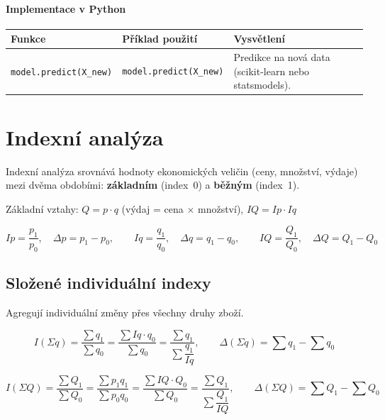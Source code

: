 \documentclass[a4paper, 11pt]{article}
\newenvironment{funkcedict}
{%
  \begingroup
  \renewcommand{\arraystretch}{1.4}%
  \lstset{basicstyle=\ttfamily\small, columns=fullflexible}%
  \setlength{\tabcolsep}{4pt}%
  \begin{tabular}{p{0.19\textwidth} p{0.38\textwidth} p{0.30\textwidth}}
  \textbf{Funkce} & \textbf{Příklad použití} & \textbf{Vysvětlení} \\
  \midrule
}
{%
  \end{tabular}%
  \endgroup
}
\begin{document}
\paragraph{Implementace v Python}\mbox{}\par

\begin{funkcedict}

	\texttt{model.predict(\allowbreak X\_new)} &
	\begin{lstlisting}
model.predict(X_new)
	\end{lstlisting}
	& Predikce na nová data (scikit-learn nebo statsmodels). \\

\end{funkcedict}


\clearpage
\section{Indexní analýza}

Indexní analýza srovnává hodnoty ekonomických veličin (ceny, množství, výdaje)
mezi dvěma obdobími: \textbf{základním} (index~0) a \textbf{běžným} (index~1).

\medskip
\noindent Základní vztahy: $Q = p \cdot q$ (výdaj = cena $\times$ množství),
$IQ = Ip \cdot Iq$

\begin{equation*}
	Ip = \frac{p_1}{p_0}, \quad \Delta p = p_1 - p_0, \qquad
	Iq = \frac{q_1}{q_0}, \quad \Delta q = q_1 - q_0, \qquad
	IQ = \frac{Q_1}{Q_0}, \quad \Delta Q = Q_1 - Q_0
\end{equation*}

\subsection{Složené individuální indexy}

Agregují individuální změny přes všechny druhy zboží.

\begin{equation*}
	I(\Sigma q) = \frac{\sum q_1}{\sum q_0}
	= \frac{\sum Iq \cdot q_0}{\sum q_0}
	= \frac{\sum q_1}{\sum \dfrac{q_1}{Iq}},
	\qquad
	\Delta(\Sigma q) = \sum q_1 - \sum q_0
\end{equation*}

\begin{equation*}
	I(\Sigma Q) = \frac{\sum Q_1}{\sum Q_0}
	= \frac{\sum p_1 q_1}{\sum p_0 q_0}
	= \frac{\sum IQ \cdot Q_0}{\sum Q_0}
	= \frac{\sum Q_1}{\sum \dfrac{Q_1}{IQ}},
	\qquad
	\Delta(\Sigma Q) = \sum Q_1 - \sum Q_0
\end{equation*}
\end{document}
